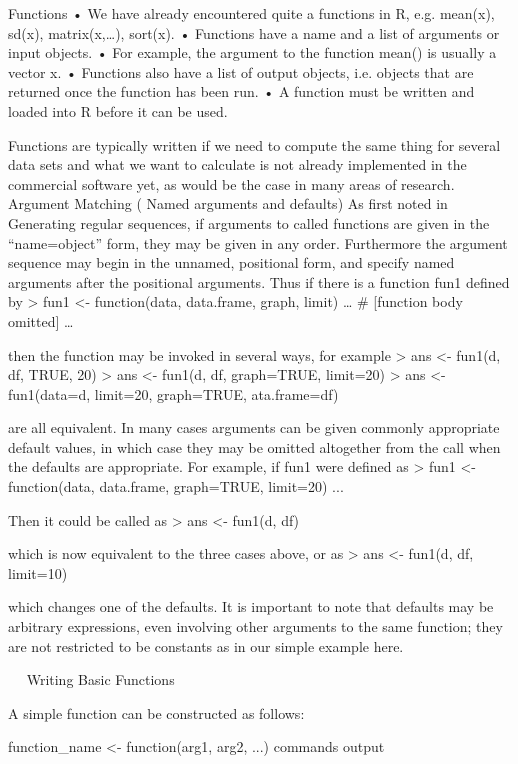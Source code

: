 Functions
•	We have already encountered quite a functions in R, e.g. mean(x), sd(x), matrix(x,…), sort(x).
•	Functions have a name and a list of arguments or input objects. 
•	For example, the argument to the function mean() is usually a vector x.
•	Functions also have a list of output objects, i.e. objects that are returned once the function has been run.
•	A function must be written and loaded into R before it can be used.

Functions are typically written if we need to compute the same thing for several data sets and what we want to calculate is not already implemented in the commercial software yet, as would be the case in many areas of research.
Argument Matching ( Named arguments and defaults)
As first noted in Generating regular sequences, if arguments to called functions are given in the “name=object” form, they may be given in any order. Furthermore the argument sequence may begin in the unnamed, positional form, and specify named arguments after the positional arguments. 
Thus if there is a function fun1 defined by 
     > fun1 <- function(data, data.frame, graph, limit) {
         …
         # [function body omitted]
         …
         }


then the function may be invoked in several ways, for example 
> ans <- fun1(d, df, TRUE, 20)
> ans <- fun1(d, df, graph=TRUE, limit=20)
> ans <- fun1(data=d, limit=20, graph=TRUE, ata.frame=df)

are all equivalent. 
In many cases arguments can be given commonly appropriate default values, in which case they may be omitted altogether from the call when the defaults are appropriate. For example, if fun1 were defined as 
> fun1 <- function(data, data.frame, graph=TRUE,  limit=20) { ... }

Then it could be called as 
> ans <- fun1(d, df)


which is now equivalent to the three cases above, or as 
> ans <- fun1(d, df, limit=10)


which changes one of the defaults. 
It is important to note that defaults may be arbitrary expressions, even involving other arguments to the same function; they are not restricted to be constants as in our simple example here. 





 
Writing Basic Functions

A simple function can be constructed as follows:

function_name <- function(arg1, arg2, ...){
commands
output
}

